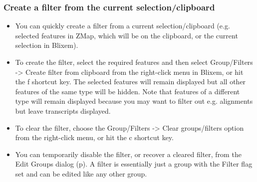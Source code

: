 \documentclass[letterpaper]{article}
\newcommand\liststyleWWviiiNumxvi{%
\renewcommand\labelitemi{{\textbullet}}
\renewcommand\labelitemii{o}
\renewcommand\labelitemiii{[F0A7?]}
\renewcommand\labelitemiv{[F0B7?]}
}
\begin{document}
{\color[rgb]{0.30980393,0.5058824,0.7411765}
\subsubsection[Create a filter from the current selection/clipboard]{Create a filter from the current selection/clipboard}}
\hypertarget{RefHeading2121056909880}{}\liststyleWWviiiNumxvi
\begin{itemize}
\item {You can quickly create a filter from a current selection/clipboard (e.g. selected features in ZMap, which will be on the clipboard, or the current selection in Blixem).}
\item {To create the filter, select the required features and then select {\textquotesingle}Group/Filters -> Create filter from clipboard{\textquotesingle} from the right-click menu in Blixem, or hit the {\textquotesingle}f{\textquotesingle} shortcut key. The selected features will remain displayed but all other features of the same type will be hidden. Note that features of a different type will remain displayed because you may want to filter out e.g. alignments but leave transcripts displayed.}
\item {To clear the filter, choose the {\textquotesingle}Group/Filters -> Clear groups/filters{\textquotesingle} option from the right-click menu, or hit the {\textquotesingle}c{\textquotesingle} shortcut key.}
\item {You can temporarily disable the filter, or recover a cleared filter, from the Edit Groups dialog (p\pageref{section:edit_group}). A filter is essentially just a group with the Filter flag set and can be edited like any other group.}
\end{itemize}
\end{document}
